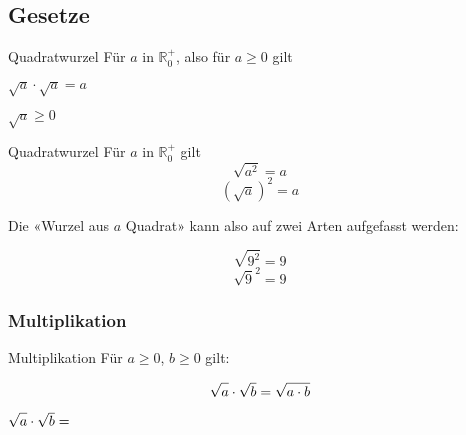 \subsection{Gesetze}

\begin{definition}{Quadratwurzel}{}
Für $a$ in $\mathbb{R}_0^{+}$, also für $a\ge 0$ gilt

$\sqrt{a} \cdot \sqrt{a} = a$

$\sqrt{a} \ge 0$
\end{definition}



\begin{gesetz}{Quadratwurzel}{}
Für $a$ in $\mathbb{R}_0^{+}$ gilt
$$\sqrt{a^2} = a$$
$$(\sqrt{a})^2 = a$$
\end{gesetz}


Die «Wurzel aus $a$ Quadrat» kann also auf zwei Arten aufgefasst werden:


\begin{beispiel}{}{}
$$\sqrt{9^2}=9$$
$$\sqrt{9}^2 = 9$$
\end{beispiel}





\newpage
\subsubsection{Multiplikation}

\begin{gesetz}{Multiplikation}{}
  Für $a\ge 0$, $b\ge 0$ gilt:
 
$$\sqrt{\vphantom{b}a}\cdot{\sqrt{b}} = \sqrt{\vphantom{b}a\cdot{b}}$$

\end{gesetz}


$\sqrt{\vphantom{b}a}\cdot\sqrt{b} =$

